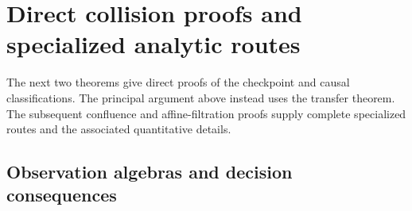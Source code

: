 \documentclass[11pt]{amsart}
\theoremstyle{definition}\newtheorem{definition}[theorem]{Definition}
\theoremstyle{remark}\newtheorem{remark}[theorem]{Remark}
\begin{document}
\section{Direct collision proofs and specialized analytic routes}
\label{app:complete-routes}
The next two theorems give direct proofs of the checkpoint and causal
classifications. The principal argument above instead uses the transfer
theorem. The subsequent confluence and affine-filtration proofs supply
complete specialized routes and the associated quantitative details.

\begingroup
\let\section\subsection
\let\subsection\subsubsection
\let\subsubsection\paragraph



\endgroup
\section{Observation algebras and decision consequences}
\label{app:decisions}
\begingroup
\let\section\subsection
\let\subsection\subsubsection
\let\subsubsection\paragraph




\endgroup
\end{document}
